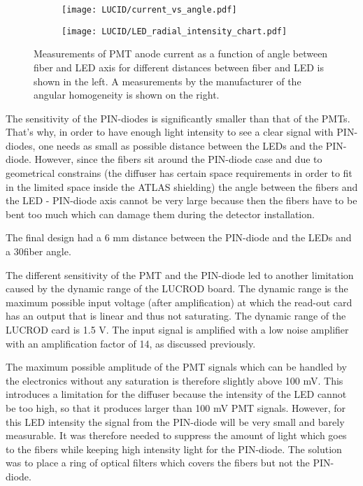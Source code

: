 \begin{figure}
\begin{subfigure}{.46\textwidth}
  \centering
  \texttt{[image: LUCID/current\_vs\_angle.pdf]}
\end{subfigure}
\begin{subfigure}{.51\textwidth}
  \centering
  \texttt{[image: LUCID/LED\_radial\_intensity\_chart.pdf]}
\end{subfigure}

\caption{
Measurements of PMT anode current as a function of angle between fiber and LED axis for different distances between fiber and LED is shown in the left.
A measurements by the manufacturer of the angular homogeneity is shown on the right.}
\label{fig:AngularDistributionOfLED}
\end{figure}

The sensitivity of the PIN-diodes is significantly smaller than that of the PMTs.
That's why, in order to have enough light intensity to see a clear signal with PIN-diodes, one needs as small as possible
distance between the LEDs and the PIN-diode. However, since the fibers sit around the PIN-diode case and due to geometrical constrains 
(the diffuser has certain space requirements in order to fit in the limited space inside the ATLAS shielding) 
the angle between the fibers and the LED - PIN-diode axis cannot be very large because then
the fibers have to be bent too much which can damage them during the detector installation.

The final design had a 6 mm distance between the PIN-diode and the LEDs and a 30\degree fiber angle.

The different sensitivity of the PMT and the PIN-diode led to another limitation caused by the dynamic range of the LUCROD board.
The dynamic range is the maximum possible input voltage (after amplification) at which the read-out card has an output that is linear and thus not saturating.
The dynamic range of the LUCROD card is 1.5 V. 
The input signal is amplified with a low noise amplifier with an amplification factor of 14, as discussed previously. 

The maximum possible amplitude of the PMT signals which can be handled by the electronics without any saturation is therefore slightly above 100 mV.
This introduces a limitation for the diffuser because the intensity of the LED cannot be too high, so that it produces larger than 100 mV PMT signals.
However, for this LED intensity the signal from the PIN-diode will be very small and barely measurable.
It was therefore needed to suppress the amount of light which goes to the fibers while keeping high intensity light for the PIN-diode.
The solution was to place a ring of optical filters which covers the fibers but not the PIN-diode.

